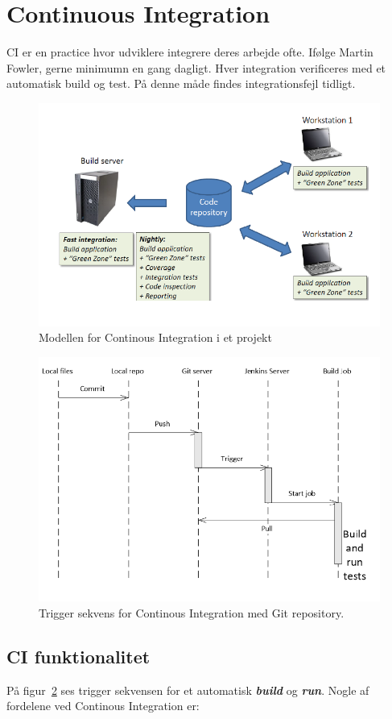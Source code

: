 \section{Continuous Integration}

CI er en practice hvor udviklere integrere deres arbejde ofte. Ifølge Martin Fowler, gerne minimumn en gang dagligt. Hver integration verificeres med et automatisk build og test. På denne måde findes integrationsfejl tidligt.

\begin{figure}[H]
\centering
\includegraphics[width=0.7\linewidth]{figs/ciArch.PNG}
\caption{Modellen for Continous Integration i et projekt}
\label{fig:ciArch}
\end{figure}

\begin{figure}[H]
\centering
\includegraphics[width=0.8\linewidth]{figs/ciTriggerSeq.PNG}
\caption{Trigger sekvens for Continous Integration med Git repository.}
\label{fig:ciTriggerSeq}
\end{figure}

\subsection{CI funktionalitet}
På figur~\ref{fig:ciTriggerSeq} ses trigger sekvensen for et automatisk \textit{\textbf{build}} og \textit{\textbf{run}}. Nogle af fordelene ved Continous Integration er:

